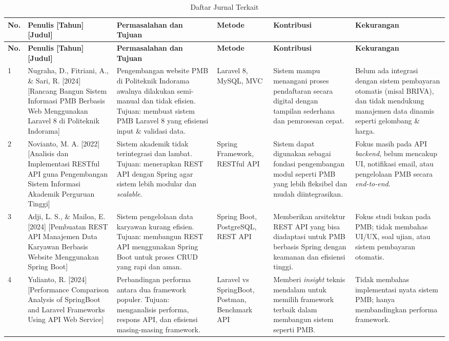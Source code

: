 \begin{longtable}{|b{}|p{}|p{}|p{}|p{}|p{}|}
	\caption{Daftar Jurnal Terkait}
	\label{table:2.literasi}\\
	\hline
	\textbf{No.} & \textbf{Penulis [Tahun] [Judul]} & \textbf{Permasalahan dan Tujuan} & \textbf{Metode} & \textbf{Kontribusi} & \textbf{Kekurangan} \\
	\hline
	\endfirsthead
	\hline
	\textbf{No.} & \textbf{Penulis [Tahun] [Judul]} & \textbf{Permasalahan dan Tujuan} & \textbf{Metode} & \textbf{Kontribusi} & \textbf{Kekurangan} \\
	\hline
	\endhead
	1 & Nugraha, D., Fitriani, A., \& Sari, R. [2024] [Rancang Bangun Sistem Informasi PMB Berbasis Web Menggunakan Laravel 8 di Politeknik Indorama] \cite{nugraha2024rancang} & Pengembangan website PMB di Politeknik Indorama awalnya dilakukan semi-manual dan tidak efisien. Tujuan: membuat sistem PMB Laravel 8 yang efisiensi input \& validasi data. & Laravel 8, MySQL, MVC & Sistem mampu menangani proses pendaftaran secara digital dengan tampilan sederhana dan pemrosesan cepat. & Belum ada integrasi dengan sistem pembayaran otomatis (misal BRIVA), dan tidak mendukung manajemen data dinamis seperti gelombang \& harga. \\
	\hline
	2 & Novianto, M. A. [2022] [Analisis dan Implementasi RESTful API guna Pengembangan Sistem Informasi Akademik Perguruan Tinggi] \cite{novianto2023analisis} & Sistem akademik tidak terintegrasi dan lambat. Tujuan: menerapkan REST API dengan Spring agar sistem lebih modular dan \textit{scalable}. & Spring Framework, RESTful API & Sistem dapat digunakan sebagai fondasi pengembangan modul seperti PMB yang lebih fleksibel dan mudah diintegrasikan. & Fokus masih pada API \textit{backend}, belum mencakup UI, notifikasi email, atau pengelolaan PMB secara \textit{end-to-end}. \\
	\hline
	3 & Adji, L. S., \& Mailoa, E. [2024] [Pembuatan REST API Manajemen Data Karyawan Berbasis Website Menggunakan Spring Boot] \cite{adji2024pembuatan} & Sistem pengelolaan data karyawan kurang efisien. Tujuan: membangun REST API menggunakan Spring Boot untuk proses CRUD yang rapi dan aman. & Spring Boot, PostgreSQL, REST API & Memberikan arsitektur REST API yang bisa diadaptasi untuk PMB berbasis Spring dengan keamanan dan efisiensi tinggi. & Fokus studi bukan pada PMB; tidak membahas UI/UX, soal ujian, atau sistem pembayaran otomatis. \\
	\hline
	4 & Yulianto, R. [2024] [Performance Comparison Analysis of SpringBoot and Laravel Frameworks Using API Web Service] \cite{yulianto2024performance} & Perbandingan performa antara dua framework populer. Tujuan: menganalisis performa, respons API, dan efisiensi masing-masing framework. & Laravel vs SpringBoot, Postman, Benchmark API & Memberi \textit{insight} teknis mendalam untuk memilih framework terbaik dalam membangun sistem seperti PMB. & Tidak membahas implementasi nyata sistem PMB; hanya membandingkan performa framework. \\

\end{longtable}
